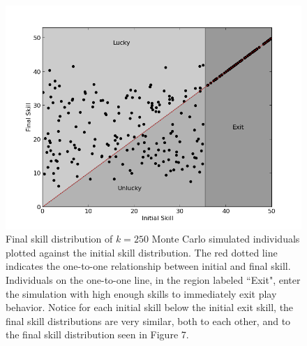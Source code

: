\begin{figure}[h]
\caption{Final skill distribution of $k=250$ Monte Carlo simulated individuals plotted against the initial skill distribution. The red dotted line indicates the one-to-one relationship between initial and final skill. Individuals on the one-to-one line, in the region labeled ``Exit", enter the simulation with high enough skills to immediately exit play behavior. Notice for each initial skill below the initial exit skill, the final skill distributions are very similar, both to each other, and to the final skill distribution seen in Figure 7. }
\begin{center}
\includegraphics[width=150mm]{mcmc2.png}
\end{center}
\label{mcmc}
\end{figure}


